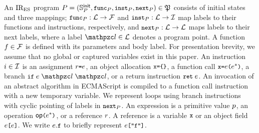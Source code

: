 An $\text{IR}_\text{ES}$ program $P = (\mathbb{S}^{\textsf{init}}_{P}, {\small \texttt{func}}_{P},
{\small \texttt{inst}}_{P}, {\small \texttt{next}}_{P}) \in \mathfrak{P} $ consists of initial states and
three mappings; ${\small \texttt{func}}_{P}: \mathcal{L} \rightarrow \mathcal{F}$ and
${\small \texttt{inst}}_{P}: \mathcal{L} \rightarrow \mathcal{I}$ map labels to their functions
and instructions, respectively, and ${\small \texttt{next}}_{P}: \mathcal{L} \rightarrow
\mathcal{L}$ maps labels to their next labels, where a label $\lab \in \labset$
denotes a program point.  A function $f \in \mathcal{F}$ is defined with its
parameters and body label.  For presentation brevity, we assume that no global
or captured variables exist in this paper.  An instruction $i \in \mathcal{I}$
is an assignment $r {\small \texttt{=}} e$, an object allocation ${\small \texttt{x}} {\small \texttt{=}} {\small \texttt{\{}}
{\small \texttt{\}}}$, a function call ${\small \texttt{x}} {\small \texttt{=}} e {\small \texttt{(}} e^* {\small \texttt{)}}$, a branch $\kwif
\; \expr \; \lab \; \lab$, or a return instruction ${\small \texttt{ret}} \; e$.  An
invocation of an abstract algorithm in ECMAScript is compiled to a function call
instruction with a new temporary variable.  We represent loops using branch
instructions with cyclic pointing of labels in ${\small \texttt{next}}_{P}$.  An expression
is a primitive value $p$, an operation $\textsf{op} {\small \texttt{(}} e^* {\small \texttt{)}}$, or a
reference $r$.  A reference is a variable ${\small \texttt{x}}$ or an object field $e
{\small \texttt{[}} e {\small \texttt{]}}$.  We write $e.{\small \texttt{f}}$ to briefly represent $e {\small \texttt{[}}
{\small \texttt{"f"}} {\small \texttt{]}}$.

